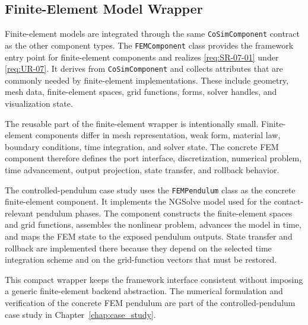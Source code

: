 \subsection{Finite-Element Model Wrapper}
\label{sec:impl_fem}

Finite-element models are integrated through the same \texttt{CoSimComponent} contract as the other component types.
The \texttt{FEMComponent} class provides the framework entry point for finite-element components and realizes \ref{req:SR-07-01} under \ref{req:UR-07}.
It derives from \texttt{CoSimComponent} and collects attributes that are commonly needed by finite-element implementations.
These include geometry, mesh data, finite-element spaces, grid functions, forms, solver handles, and visualization state.

The reusable part of the finite-element wrapper is intentionally small.
Finite-element components differ in mesh representation, weak form, material law, boundary conditions, time integration, and solver state.
The concrete \ac{FEM} component therefore defines the port interface, discretization, numerical problem, time advancement, output projection, state transfer, and rollback behavior.

The controlled-pendulum case study uses the \texttt{FEMPendulum} class as the concrete finite-element component.
It implements the NGSolve model used for the contact-relevant pendulum phases.
The component constructs the finite-element spaces and grid functions, assembles the nonlinear problem, advances the model in time, and maps the \ac{FEM} state to the exposed pendulum outputs.
State transfer and rollback are implemented there because they depend on the selected time integration scheme and on the grid-function vectors that must be restored.

This compact wrapper keeps the framework interface consistent without imposing a generic finite-element backend abstraction.
The numerical formulation and verification of the concrete \ac{FEM} pendulum are part of the controlled-pendulum case study in Chapter~\ref{chap:case_study}.